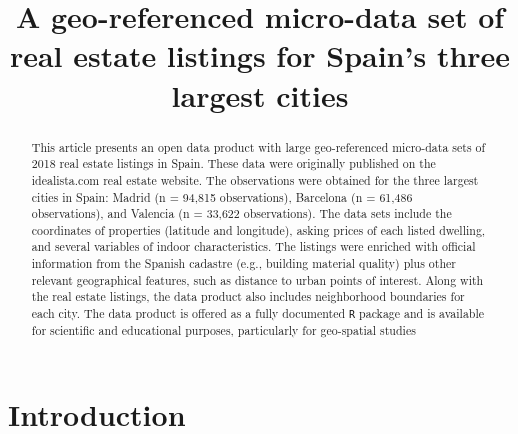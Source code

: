 \documentclass[Royal,times,sageh]{sagej}
\begin{document}

\title{A geo-referenced micro-data set of real estate listings for
Spain's three largest cities}


\author{\affilnum{}}

\affiliation{}



\begin{abstract}
This article presents an open data product with large geo-referenced
micro-data sets of 2018 real estate listings in Spain. These data were
originally published on the idealista.com real estate website. The
observations were obtained for the three largest cities in Spain: Madrid
(n = 94,815 observations), Barcelona (n = 61,486 observations), and
Valencia (n = 33,622 observations). The data sets include the
coordinates of properties (latitude and longitude), asking prices of
each listed dwelling, and several variables of indoor characteristics.
The listings were enriched with official information from the Spanish
cadastre (e.g., building material quality) plus other relevant
geographical features, such as distance to urban points of interest.
Along with the real estate listings, the data product also includes
neighborhood boundaries for each city. The data product is offered as a
fully documented \texttt{R} package and is available for scientific and
educational purposes, particularly for geo-spatial studies
\end{abstract}


\maketitle

\hypertarget{introduction}{%
\section{Introduction}\label{introduction}}
\end{document}

